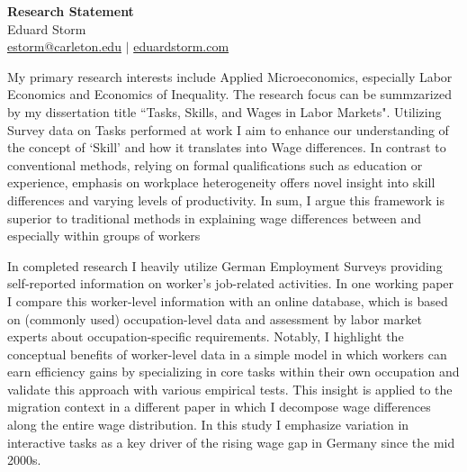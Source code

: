 \documentclass[a4paper,11pt]{article}
\begin{document}
\thispagestyle{plain}

\begin{center}
 {\Large \textbf{Research Statement}} \\
 Eduard Storm \\
 \href{mailto:estorm@carleton.edu}{estorm@carleton.edu} $|$ \href{https://eduardstorm.com/}{eduardstorm.com}
\end{center}

\noindent

My primary research interests include Applied Microeconomics, especially Labor Economics and Economics of Inequality. The research focus can be summzarized by my dissertation title ``Tasks, Skills, and Wages in Labor Markets". Utilizing Survey data on Tasks performed at work I aim to enhance our understanding of the concept of `Skill' and how it translates into Wage differences. In contrast to conventional methods, relying on formal qualifications such as education or experience, emphasis on workplace heterogeneity offers novel insight into skill differences and varying levels of productivity. In sum, I argue this framework is superior to traditional methods in explaining wage differences between and especially within groups of workers


In completed research I heavily utilize German Employment Surveys providing self-reported information on worker's job-related activities. In one working paper I compare this worker-level information with an online database, which is based on (commonly used) occupation-level data and assessment by labor market experts about occupation-specific requirements. Notably, I highlight the conceptual benefits of worker-level data in a simple model in which workers can earn efficiency gains by specializing in core tasks within their own occupation and validate this approach with various empirical tests. This insight is applied to the migration context in a different paper in which I decompose wage differences along the entire wage distribution. In this study I emphasize variation in interactive tasks as a key driver of the rising wage gap in Germany since the mid 2000s. 
\end{document}

